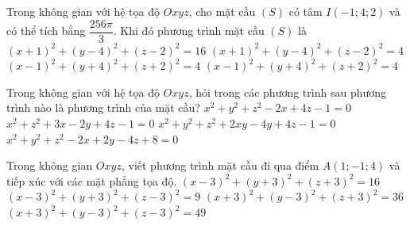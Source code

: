 \begin{ex}%
	Trong không gian với hệ tọa độ $Oxyz$, cho mặt cầu $(S)$ có tâm $I(-1;4;2)$ và có thể tích bằng $\dfrac{256\pi }{3}$. Khi đó phương trình mặt cầu $(S)$ là
	\choice
	{\True $(x+1)^2+(y-4)^2+(z-2)^2=16$}
	{$(x+1)^2+(y-4)^2+(z-2)^2=4$}
	{$(x-1)^2+(y+4)^2+(z+2)^2=4$}
	{$(x-1)^2+(y+4)^2+(z+2)^2=4$}
\end{ex}

\begin{ex}%
	Trong không gian với hệ tọa độ $Oxyz$, hỏi trong các phương trình sau phương trình nào là phương trình của mặt cầu?
	\choice
	{\True $x^2+y^2+z^2-2x+4z-1=0$}
	{$x^2+z^2+3x-2y+4z-1=0$}
	{$x^2+y^2+z^2+2xy-4y+4z-1=0$}
	{$x^2+y^2+z^2-2x+2y-4z+8=0$}
\end{ex}

\begin{ex}%
	Trong không gian $Oxyz$, viết phương trình mặt cầu đi qua điểm $A(1;-1;4)$ và tiếp xúc với các mặt phẳng tọa độ.
	\choice
	{$(x-3)^2+(y+3)^2+(z+3)^2=16$}
	{\True $(x-3)^2+(y+3)^2+(z-3)^2=9$}
	{$(x+3)^2+(y-3)^2+(z+3)^2=36$}
	{$(x+3)^2+(y-3)^2+(z-3)^2=49$}
\end{ex}

